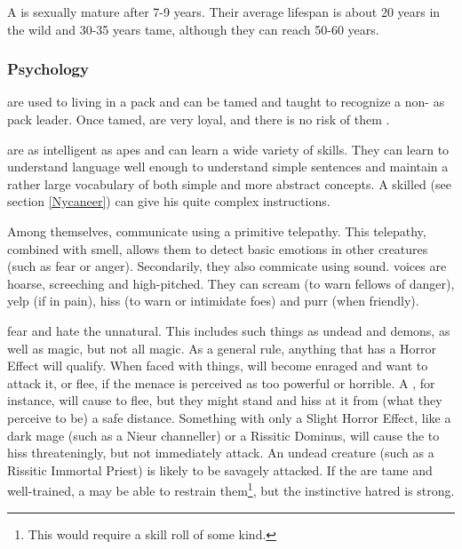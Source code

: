 A \nycan{} is sexually mature after 7-9 years. Their average lifespan is about 20 years in the wild and 30-35 years tame, although they can reach 50-60 years. 

\subsubsection{Psychology}
\Nycans{} are used to living in a pack and can be tamed and taught to recognize a non-\nycan{} as pack leader. Once tamed, \nycans{} are very loyal, and there is no risk of them . 

\Nycans{} are as intelligent as apes and can learn a wide variety of skills. They can learn to understand language well enough to understand simple sentences and maintain a rather large vocabulary of both simple and more abstract concepts. A skilled \nycaneer{} (see section \ref{Nycaneer}) can give his \nycans{} quite complex instructions. 

Among themselves, \nycans{} communicate using a primitive telepathy. This telepathy, combined with smell, allows them to detect basic emotions in other creatures (such as fear or anger). Secondarily, they also commicate using sound. \Nycan{} voices are hoarse, screeching and high-pitched. They can scream (to warn fellows of danger), yelp (if in pain), hiss (to warn or intimidate foes) and purr (when friendly). 


\Nycans{} fear and hate the unnatural. This includes such things as undead and demons, as well as  magic, but not all magic. As a general rule, anything that has a Horror Effect will qualify. When faced with  things, \nycans{} will become enraged and want to attack it, or flee, if the menace is perceived as too powerful or horrible. A \bane{}, for instance, will cause \nycans{} to flee, but they might stand and hiss at it from (what they perceive to be) a safe distance. Something with only a Slight Horror Effect, like a dark mage (such as a Nieur channeller) or a Rissitic Dominus, will cause the \nycans{} to hiss threateningly, but not immediately attack. An undead creature (such as a Rissitic Immortal Priest) is likely to be savagely attacked. If the \nycans{} are tame and well-trained, a \nycaneer{} may be able to restrain them\footnote{This would require a skill roll of some kind.}, but the instinctive hatred is strong. 

